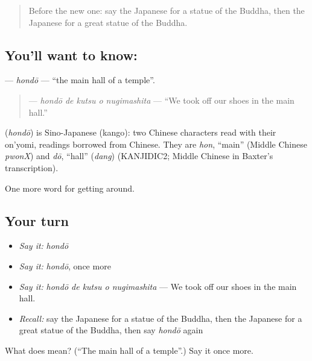 \begin{quote}
Before the new one: say the Japanese for a statue of the Buddha, then the Japanese for a great statue of the Buddha.
\end{quote}

\subsection*{You'll want to know: }
\textbf{} — \emph{hondō} — \textquotedblleft{}the main hall of a temple\textquotedblright{}.

\begin{quote}
\textbf{  } — \emph{hondō de kutsu o nugimashita} — \textquotedblleft{}We took off our shoes in the main hall.\textquotedblright{}
\end{quote}

\begin{cousinweb}
\textbf{} (\emph{hondō}) is Sino-Japanese (kango): two Chinese characters read with their on'yomi, readings borrowed from Chinese. They are \emph{hon}, \textquotedblleft{}main\textquotedblright{} (Middle Chinese \emph{pwonX}) and \emph{dō}, \textquotedblleft{}hall\textquotedblright{} (\emph{dang}) (KANJIDIC2; Middle Chinese in Baxter's transcription).
\end{cousinweb}

\begin{grammarlens}[title={What you've built}]
One more word for getting around.
\end{grammarlens}

\subsection*{Your turn}
\begin{itemize}
\raggedright
  \item \emph{Say it:} \emph{hondō}
  \item \emph{Say it:} \emph{hondō}, once more
  \item \emph{Say it:} \emph{hondō de kutsu o nugimashita} — We took off our shoes in the main hall.
  \item \emph{Recall:} say the Japanese for a statue of the Buddha, then the Japanese for a great statue of the Buddha, then say \emph{hondō} again
\end{itemize}

\begin{tcolorbox}[breakable,colback=teal!4,colframe=teal!35!black,title={Before you move on}]
What does  mean? (\textquotedblleft{}The main hall of a temple\textquotedblright{}.) Say it once more.
\end{tcolorbox}
